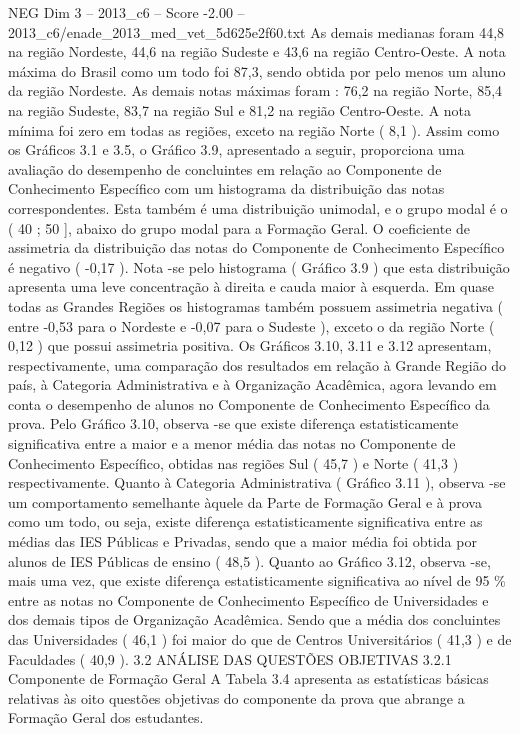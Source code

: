 \begin{textsample}{NEG Dim 3 – 2013\_c6 – Score -2.00 – 2013\_c6/enade\_2013\_med\_vet\_5d625e2f60.txt}
As demais medianas foram 44,8 na região Nordeste, 44,6 na região Sudeste e 43,6 na região Centro-Oeste.
A nota máxima do Brasil como um todo foi 87,3, sendo obtida por pelo menos um aluno da região Nordeste.
As demais notas máximas foram : 76,2 na região Norte, 85,4 na região Sudeste, 83,7 na região Sul e 81,2 na região Centro-Oeste.
A nota mínima foi zero em todas as regiões, exceto na região Norte ( 8,1 ).
Assim como os Gráficos 3.1 e 3.5, o Gráfico 3.9, apresentado a seguir, proporciona uma avaliação do desempenho de concluintes em relação ao Componente de Conhecimento Específico com um histograma da distribuição das notas correspondentes.
Esta também é uma distribuição unimodal, e o grupo modal é o ( 40 ; 50 ], abaixo do grupo modal para a Formação Geral.
O coeficiente de assimetria da distribuição das notas do Componente de Conhecimento Específico é negativo ( -0,17 ).
Nota -se pelo histograma ( Gráfico 3.9 ) que esta distribuição apresenta uma leve concentração à direita e cauda maior à esquerda.
Em quase todas as Grandes Regiões os histogramas também possuem assimetria negativa ( entre -0,53 para o Nordeste e -0,07 para o Sudeste ), exceto o da região Norte ( 0,12 ) que possui assimetria positiva.
Os Gráficos 3.10, 3.11 e 3.12 apresentam, respectivamente, uma comparação dos resultados em relação à Grande Região do país, à Categoria Administrativa e à Organização Acadêmica, agora levando em conta o desempenho de alunos no Componente de Conhecimento Específico da prova.
Pelo Gráfico 3.10, observa -se que existe diferença estatisticamente significativa entre a maior e a menor média das notas no Componente de Conhecimento Específico, obtidas nas regiões Sul ( 45,7 ) e Norte ( 41,3 ) respectivamente.
Quanto à Categoria Administrativa ( Gráfico 3.11 ), observa -se um comportamento semelhante àquele da Parte de Formação Geral e à prova como um todo, ou seja, existe diferença estatisticamente significativa entre as médias das IES Públicas e Privadas, sendo que a maior média foi obtida por alunos de IES Públicas de ensino ( 48,5 ).
Quanto ao Gráfico 3.12, observa -se, mais uma vez, que existe diferença estatisticamente significativa ao nível de 95 \% entre as notas no Componente de Conhecimento Específico de Universidades e dos demais tipos de Organização Acadêmica.
Sendo que a média dos concluintes das Universidades ( 46,1 ) foi maior do que de Centros Universitários ( 41,3 ) e de Faculdades ( 40,9 ). 3.2 ANÁLISE DAS QUESTÕES OBJETIVAS 3.2.1 Componente de Formação Geral A Tabela 3.4 apresenta as estatísticas básicas relativas às oito questões objetivas do componente da prova que abrange a Formação Geral dos estudantes.

\end{textsample}
